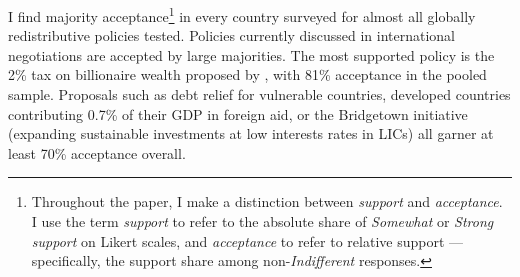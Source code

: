 \documentclass[12pt,english]{article}
\begin{document}
\begin{bibunit}


I find majority acceptance\footnote{Throughout the paper, I make a distinction between \textit{support} and \textit{acceptance}. I use the term \textit{support} to refer to the absolute share of \textit{Somewhat} or \textit{Strong support} on Likert scales, and \textit{acceptance} to refer to relative support ---specifically, the support share among non-\textit{Indifferent} responses.} in every country surveyed for almost all globally redistributive policies tested. Policies currently discussed in international negotiations are accepted by large majorities. The most supported %
policy is the 2\% tax on billionaire wealth proposed by \cite{zucman_blueprint_2024}, with 81\% acceptance in the pooled sample. Proposals such as debt relief for vulnerable countries, developed countries contributing 0.7\% of their GDP in foreign aid, %
or the Bridgetown initiative (expanding sustainable investments at low interests rates in LICs) all garner at least 70\% acceptance overall. 


\end{bibunit}
\end{document}
